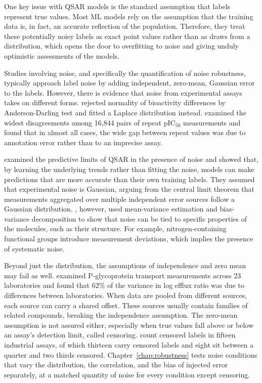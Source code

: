 One key issue with QSAR models is the standard assumption that labels represent true values. Most ML models rely on the assumption that the training data is, in fact, an accurate reflection of the population. Therefore, they treat these potentially noisy labels as exact point values rather than as draws from a distribution, which opens the door to overfitting to noise and giving unduly optimistic assessments of the models.

Studies involving noise, and specifically the quantification of noise robustness, typically approach label noise by adding independent, zero-mean, Gaussian error to the labels. However, there is evidence that noise from experimental assays takes on different forms. \citet{Kruger2012} rejected normality of bioactivity differences by Anderson-Darling test and fitted a Laplace distribution instead. \citet{Kalliokoski2013} examined the widest disagreements among 16,844 pairs of repeat pIC$_{50}$ measurements and found that in almost all cases, the wide gap between repeat values was due to annotation error rather than to an imprecise assay.

\citet{Kolmar2021} examined the predictive limits of QSAR in the presence of noise and showed that, by learning the underlying trends rather than fitting the noise, models can make predictions that are more accurate than their own training labels. They assumed that experimental noise is Gaussian, arguing from the central limit theorem that measurements aggregated over multiple independent error sources follow a Gaussian distribution. \citet{Heid2023}, however, used mean-variance estimation and bias-variance decomposition to show that noise can be tied to specific properties of the molecules, such as their structure. For example, nitrogen-containing functional groups introduce measurement deviations, which implies the presence of systematic noise.

Beyond just the distribution, the assumptions of independence and zero mean may fail as well. \citet{Bentz2013} examined P-glycoprotein transport measurements across 23 laboratories and found that $62\%$ of the variance in log efflux ratio was due to differences between laboratories. When data are pooled from different sources, each source can carry a shared offset. These sources usually contain families of related compounds, breaking the independence assumption. The zero-mean assumption is not assured either, especially when true values fall above or below an assay's detection limit, called censoring. \citet{Svensson2025} count censored labels in fifteen industrial assays, of which thirteen carry censored labels and eight sit between a quarter and two thirds censored. Chapter~\ref{chap:robustness} tests noise conditions that vary the distribution, the correlation, and the bias of injected error separately, at a matched quantity of noise for every condition except censoring.

